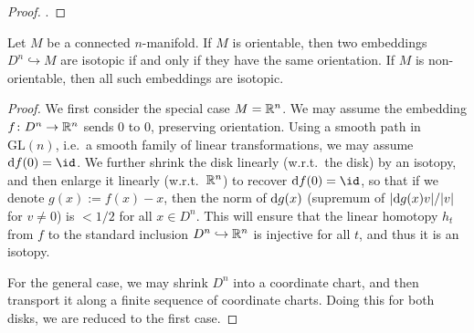 \begin{proof}
    \cite[Theorem~8.1.3]{hirsch}.
\end{proof}

\begin{lemma}\label{prop:move-disk}
Let $M$ be a connected $n$-manifold.
If $M$ is orientable,
then two embeddings $D^n\hookrightarrow M$ are isotopic
if and only if they have the same orientation.
If $M$ is non-orientable, then all such embeddings are isotopic.
\end{lemma}

\begin{proof}
We first consider the special case $M=\mathbb{R}^n$.
We may assume the embedding $f\colon D^n\to\mathbb{R}^n$ sends $0$ to $0$,
preserving orientation.
Using a smooth path in $\mathrm{GL}(n)$, i.e.\ a smooth family of linear transformations,
we may assume $\d f(0)=\id$.
We further shrink the disk linearly (w.r.t.\ the disk) by an isotopy,
and then enlarge it linearly (w.r.t.\ $\mathbb{R}^n$) to recover $\d f(0)=\id$,
so that if we denote $g(x):=f(x)-x$,
then the norm of $\mathrm{d} g(x)$ (supremum of $|\mathrm{d} g(x)v|/|v|$ for $v\neq0$) is $<1/2$ for all $x\in D^n$.
This will ensure that the linear homotopy $h_t$ from $f$ to the standard inclusion $D^n\hookrightarrow\mathbb{R}^n$
is injective for all $t$, and thus it is an isotopy.

For the general case, we may shrink $D^n$ into a coordinate chart,
and then transport it along a finite sequence of coordinate charts.
Doing this for both disks, we are reduced to the first case.
\end{proof}
